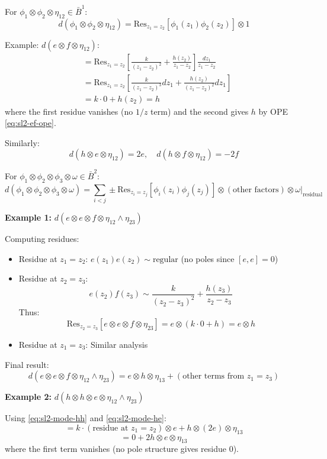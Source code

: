 \begin{computation}
For $\phi_1 \otimes \phi_2 \otimes \eta_{12} \in \bar{B}^1$:
$$d(\phi_1 \otimes \phi_2 \otimes \eta_{12}) = \text{Res}_{z_1=z_2}[\phi_1(z_1)\phi_2(z_2)] \otimes 1$$

Example: $d(e \otimes f \otimes \eta_{12})$:
\begin{align*}
&= \text{Res}_{z_1=z_2}\left[\frac{k}{(z_1-z_2)^2} + \frac{h(z_2)}{z_1-z_2}\right] \frac{dz_1}{z_1-z_2} \\
&= \text{Res}_{z_1=z_2}\left[\frac{k}{(z_1-z_2)^3}dz_1 + \frac{h(z_2)}{(z_1-z_2)^2}dz_1\right] \\
&= k \cdot 0 + h(z_2) = h
\end{align*}
where the first residue vanishes (no $1/z$ term) and the second gives $h$ by OPE \eqref{eq:sl2-ef-ope}.

Similarly:
$$d(h \otimes e \otimes \eta_{12}) = 2e, \quad d(h \otimes f \otimes \eta_{12}) = -2f$$
\end{computation}

\begin{computation}
For $\phi_1 \otimes \phi_2 \otimes \phi_3 \otimes \omega \in \bar{B}^2$:
$$d(\phi_1 \otimes \phi_2 \otimes \phi_3 \otimes \omega) = \sum_{i<j} \pm \text{Res}_{z_i=z_j}[\phi_i(z_i)\phi_j(z_j)] \otimes (\text{other factors}) \otimes \omega|_{\text{residual}}$$

\textbf{Example 1:} $d(e \otimes e \otimes f \otimes \eta_{12} \wedge \eta_{23})$

Computing residues:
\begin{itemize}
\item Residue at $z_1=z_2$: $e(z_1)e(z_2) \sim \text{regular}$ (no poles since $[e,e]=0$)
\item Residue at $z_2=z_3$: 
$$e(z_2)f(z_3) \sim \frac{k}{(z_2-z_3)^2} + \frac{h(z_3)}{z_2-z_3}$$
Thus:
$$\text{Res}_{z_2=z_3}[e \otimes e \otimes f \otimes \eta_{23}] = e \otimes (k \cdot 0 + h) = e \otimes h$$
\item Residue at $z_1=z_3$: Similar analysis
\end{itemize}

Final result:
$$d(e \otimes e \otimes f \otimes \eta_{12} \wedge \eta_{23}) = e \otimes h \otimes \eta_{13} + (\text{other terms from } z_1=z_3)$$

\textbf{Example 2:} $d(h \otimes h \otimes e \otimes \eta_{12} \wedge \eta_{23})$

Using \eqref{eq:sl2-mode-hh} and \eqref{eq:sl2-mode-he}:
$$= k \cdot (\text{residue at } z_1=z_2) \otimes e + h \otimes (2e) \otimes \eta_{13}$$
$$= 0 + 2 h \otimes e \otimes \eta_{13}$$
where the first term vanishes (no pole structure gives residue 0).
\end{computation}

